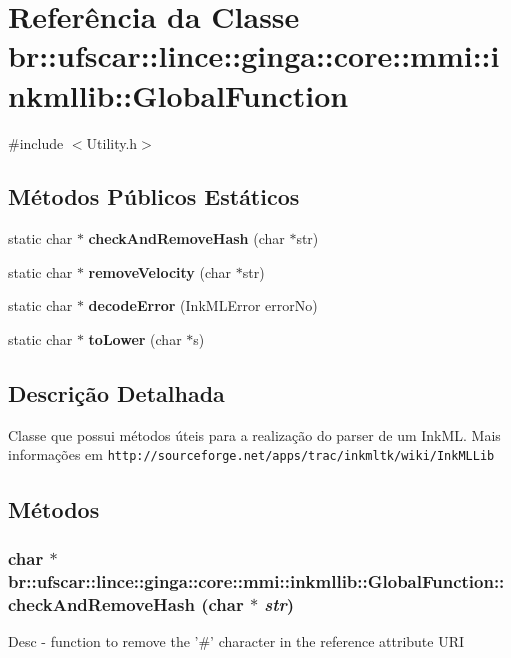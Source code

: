 \section{Referência da Classe br::ufscar::lince::ginga::core::mmi::inkmllib::GlobalFunction}
\label{classbr_1_1ufscar_1_1lince_1_1ginga_1_1core_1_1mmi_1_1inkmllib_1_1GlobalFunction}


{\ttfamily \#include $<$Utility.h$>$}

\subsection*{Métodos Públicos Estáticos}
\begin{DoxyCompactItemize}
\item 
static char $\ast$ {\bf checkAndRemoveHash} (char $\ast$str)
\item 
static char $\ast$ {\bf removeVelocity} (char $\ast$str)
\item 
static char $\ast$ {\bf decodeError} (InkMLError errorNo)
\item 
static char $\ast$ {\bf toLower} (char $\ast$s)
\end{DoxyCompactItemize}


\subsection{Descrição Detalhada}
Classe que possui métodos úteis para a realização do parser de um InkML. Mais informações em {\tt http://sourceforge.net/apps/trac/inkmltk/wiki/InkMLLib} 

\subsection{Métodos}
\subsubsection[{checkAndRemoveHash}]{\setlength{\rightskip}{0pt plus 5cm}char $\ast$ br::ufscar::lince::ginga::core::mmi::inkmllib::GlobalFunction::checkAndRemoveHash (char $\ast$ {\em str})\hspace{0.3cm}{\ttfamily  [static]}}\label{classbr_1_1ufscar_1_1lince_1_1ginga_1_1core_1_1mmi_1_1inkmllib_1_1GlobalFunction_a5620a996e81c75c99178e3eff4862fba}
Desc -\/ function to remove the '\#' character in the reference attribute URI 

